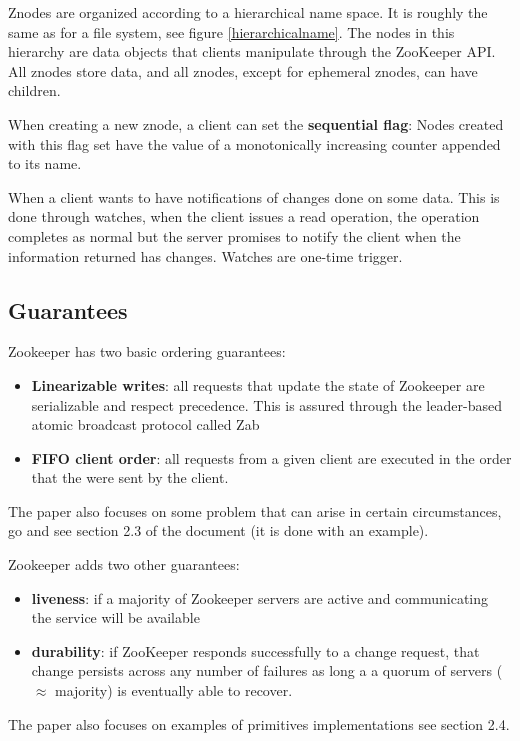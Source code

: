 Znodes are organized according to a hierarchical name space. It is roughly the same as for a file system, see figure \ref{hierarchicalname}. The nodes in this hierarchy are data objects that clients manipulate through the ZooKeeper API. All znodes store data, and all znodes, except for ephemeral znodes, can have children.

When creating a new znode, a client can set the \textbf{sequential flag}: Nodes created with this flag set have the value of a monotonically increasing counter appended to its name.

When a client wants to have notifications of changes done on some data. This is done through watches, when the client issues a read operation, the operation completes as normal but the server promises to notify the client when the information returned has changes. Watches are one-time trigger.



\subsection{Guarantees}
Zookeeper has two basic ordering guarantees: 
\begin{itemize}
\item \textbf{Linearizable writes}: all requests that update the state of Zookeeper are serializable and respect precedence. This is assured through the leader-based atomic broadcast protocol called Zab
\item \textbf{FIFO client order}: all requests from a given client are executed in the order that the were sent by the client.
\end{itemize}

The paper also focuses on some problem that can arise in certain circumstances, go and see section 2.3 of the document (it is done with an example).

Zookeeper adds two other guarantees:
\begin{itemize}
\item \textbf{liveness}: if a majority of Zookeeper servers are active and communicating the service will be available
\item \textbf{durability}: if ZooKeeper responds successfully to a change request, that change persists across any number of failures as long a a quorum of servers ($\approx$ majority) is eventually able to recover.
\end{itemize}

The paper also focuses on examples of primitives implementations see section 2.4.
